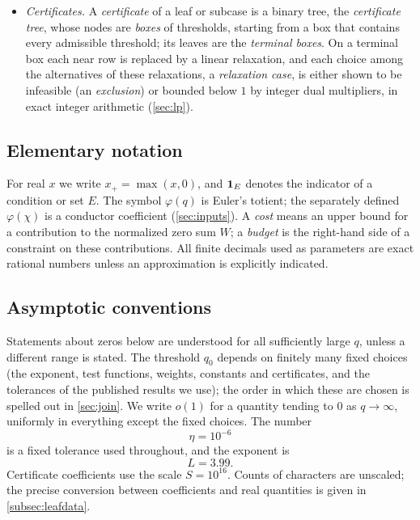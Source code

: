 \begin{itemize}
    has a \emph{feature}, a lower bound for how strongly its zero is detected, and a
    \emph{diagonal}, what it costs on its own, and one \emph{correlation term} bounds the
    interaction between distinct entries (\cref{prop:threshold}). The entries of a family whose
    zeros are known are grouped into \emph{family terms}. A row is built from two test functions,
    a \emph{detector} and a \emph{Gram test} (\cref{def:neardatum}); by the choice of its anchors and
    sieve weight it is a \emph{family}, \emph{shifted}, \emph{graded} or \emph{two-test} row
    (\cref{tab:rowkinds}). It is linear in the columns once an auxiliary number, its
    \emph{threshold} $\tau$, is fixed.
  \item \emph{Certificates.} A \emph{certificate} of a leaf or subcase is a binary tree, the
    \emph{certificate tree}, whose nodes are \emph{boxes} of thresholds, starting from a box that
    contains every admissible threshold; its leaves are the \emph{terminal boxes}. On a terminal
    box each near row is replaced by a linear relaxation, and each choice among the alternatives
    of these relaxations, a \emph{relaxation case}, is either shown to be infeasible (an
    \emph{exclusion}) or bounded below $1$ by integer dual multipliers, in exact integer
    arithmetic (\cref{sec:lp}).
\end{itemize}

\subsection{Elementary notation}
For real $x$ we write $x_+=\max(x,0)$, and $\mathbf{1}_E$ denotes the indicator of a condition or
set $E$. The symbol $\varphi(q)$ is Euler's totient; the separately defined
$\varphi(\chi)$ is a conductor coefficient (\cref{sec:inputs}). A \emph{cost} means an
upper bound for a contribution to the normalized zero sum $W$; a \emph{budget} is the
right-hand side of a constraint on these contributions. All finite decimals used as
parameters are exact rational numbers unless an approximation is explicitly indicated.

\subsection{Asymptotic conventions}
Statements about zeros below are understood for all sufficiently large $q$, unless a
different range is stated. The threshold $q_0$ depends on finitely many fixed choices
(the exponent, test functions, weights, constants and certificates, and the tolerances of the
published results we use); the order in which these are chosen is spelled out in \cref{sec:join}.
We write $o(1)$ for a quantity tending to $0$ as $q\to\infty$, uniformly in everything except
the fixed choices. The number
\[
  \eta=10^{-6}
\]
is a fixed tolerance used throughout, and the exponent is
\[
  L=3.99 .
\]
Certificate coefficients use the scale $S=10^{16}$. Counts of characters are unscaled;
the precise conversion between coefficients and real quantities is given in
\cref{subsec:leafdata}.


